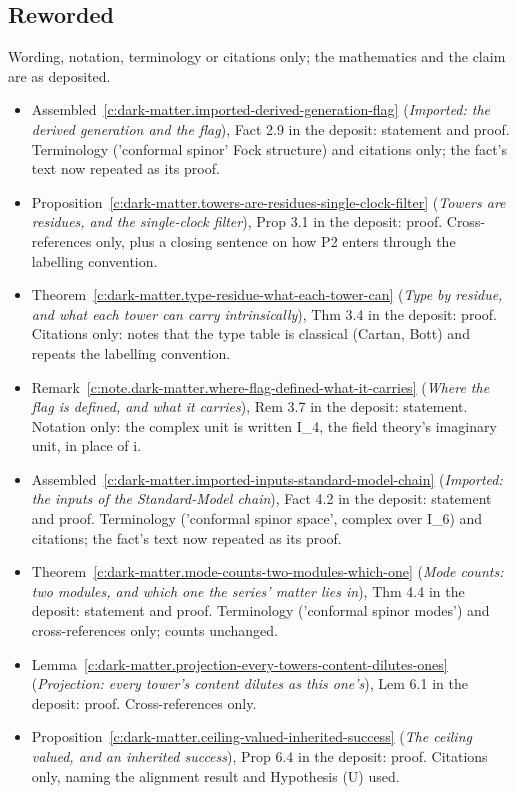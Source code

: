 \documentclass[11pt]{article}
\theoremstyle{definition}
\theoremstyle{plain}
\begin{document}
\subsection*{Reworded}
Wording, notation, terminology or citations only; the mathematics and the claim are as deposited.
\begin{itemize}\setlength{\itemsep}{2pt}
\item Assembled~\ref{c:dark-matter.imported-derived-generation-flag} (\emph{Imported: the derived generation and the flag}), Fact 2.9 in the deposit: statement and proof. Terminology ('conformal spinor' Fock structure) and citations only; the fact's text now repeated as its proof.
\item Proposition~\ref{c:dark-matter.towers-are-residues-single-clock-filter} (\emph{Towers are residues, and the single-clock filter}), Prop 3.1 in the deposit: proof. Cross-references only, plus a closing sentence on how P2 enters through the labelling convention.
\item Theorem~\ref{c:dark-matter.type-residue-what-each-tower-can} (\emph{Type by residue, and what each tower can carry intrinsically}), Thm 3.4 in the deposit: proof. Citations only: notes that the type table is classical (Cartan, Bott) and repeats the labelling convention.
\item Remark~\ref{c:note.dark-matter.where-flag-defined-what-it-carries} (\emph{Where the flag is defined, and what it carries}), Rem 3.7 in the deposit: statement. Notation only: the complex unit is written I\_4, the field theory's imaginary unit, in place of i.
\item Assembled~\ref{c:dark-matter.imported-inputs-standard-model-chain} (\emph{Imported: the inputs of the Standard-Model chain}), Fact 4.2 in the deposit: statement and proof. Terminology ('conformal spinor space', complex over I\_6) and citations; the fact's text now repeated as its proof.
\item Theorem~\ref{c:dark-matter.mode-counts-two-modules-which-one} (\emph{Mode counts: two modules, and which one the series' matter lies in}), Thm 4.4 in the deposit: statement and proof. Terminology ('conformal spinor modes') and cross-references only; counts unchanged.
\item Lemma~\ref{c:dark-matter.projection-every-towers-content-dilutes-ones} (\emph{Projection: every tower's content dilutes as this one's}), Lem 6.1 in the deposit: proof. Cross-references only.
\item Proposition~\ref{c:dark-matter.ceiling-valued-inherited-success} (\emph{The ceiling valued, and an inherited success}), Prop 6.4 in the deposit: proof. Citations only, naming the alignment result and Hypothesis (U) used.

\end{itemize}
\end{document}
